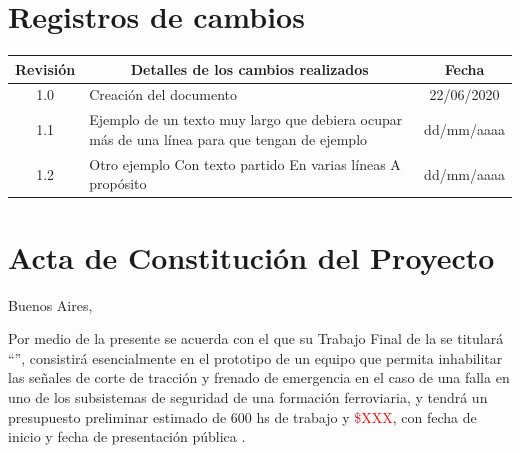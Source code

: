 \documentclass[11pt]{charter}
\begin{document}
\maketitle
\thispagestyle{empty}
\pagebreak


\thispagestyle{empty}
{\setlength{\parskip}{0pt}
\tableofcontents{}
}
\pagebreak


\section{Registros de cambios}
\label{sec:registro}


\begin{table}[ht]
\label{tab:registro}
\centering

\begin{tabularx}{\linewidth}{@{}|c|X|c|@{}}
\hline
\rowcolor[HTML]{C0C0C0} 
Revisión & \multicolumn{1}{c|}{\cellcolor[HTML]{C0C0C0}Detalles de los cambios realizados} & Fecha      \\ \hline
1.0      & Creación del documento                                                          & 22/06/2020 \\ \hline
1.1      & Ejemplo de un texto muy largo que debiera ocupar más de una línea para que tengan de ejemplo                                                                                																						   & dd/mm/aaaa \\ \hline
1.2      & Otro ejemplo \newline
		   Con texto partido \newline
		   En varias líneas \newline
		   A propósito                                                                     & dd/mm/aaaa \\ \hline
\end{tabularx}
\end{table}

\pagebreak



\section{Acta de Constitución del Proyecto}
\label{sec:acta}

\begin{flushright}
Buenos Aires, \fechaInicioName
\end{flushright}

\vspace{2cm}

Por medio de la presente se acuerda con el \authorname\hspace{1px} que su Trabajo Final de la \degreename\hspace{1px} 
se titulará ``\ttitle'', consistirá esencialmente en el prototipo de un equipo que permita inhabilitar las señales de 
corte de tracción y frenado de emergencia en el caso de una falla en uno de los subsistemas de seguridad de una 
formación ferroviaria, y tendrá un presupuesto preliminar estimado de 600 hs de trabajo y \textcolor{red}{\$XXX}, con 
fecha de inicio \fechaInicioName\hspace{1px} y fecha de presentación pública \fechaFinalName.
\end{document}
